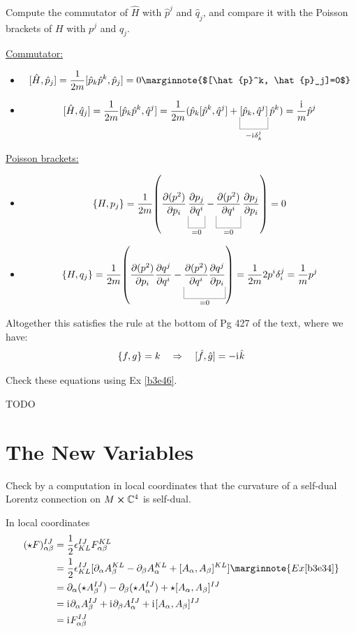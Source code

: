 \documentclass[10pt]{article}
\begin{document}
\begin{example}
	Compute the commutator of $\hat H$ with $\hat{p}^j$ and $\hat{q}_j$, and compare it with the Poisson brackets of $H$ with $p^j$ and $q_j$.
\end{example}
\sol \underline{Commutator:}
\begin{itemize}
	\item $$[\hat{H}, \hat{p}_j] = \frac{1}{2m}[\hat{p}_k\hat{p}^k, \hat{p}_j] = 0\marginnote{$[\hat{p}^k, \hat{p}_j]=0$}$$
	\item $$[\hat{H}, \hat{q}_j] = \frac{1}{2m}[\hat{p}_k\hat{p}^k, \hat{q}^j] = \frac{1}{2m}\p{\hat{p}_k[\hat{p}^k, \hat{q}^j] + \ub{[\hat{p}_k, \hat{q}^j]}{-
	\di\delta_k^j}\hat{p}^k} = \frac{\di}{m}\hat{p}^j$$
\end{itemize}
\underline{Poisson brackets:}
\begin{itemize}
	\item $$\br{H, p_j} = \frac{1}{2m}\p*{\pd{(p^2)}{p_i}\ub{\pd{p_j}{q^i}}{=0} - \ub{\pd{(p^2)}{q^i}}{=0}\pd{p_j}{p_i}} = 0$$
	\item $$\br{H, q_j} = \frac{1}{2m}\p*{\pd{(p^2)}{p_i}\pd{q^j}{q^i} - \ub{\pd{(p^2)}{q^i}\pd{q^j}{p_i}}{=0}} = \frac{1}{2m}2p^i\delta_i^j = \frac{1}{m}p^j$$
\end{itemize}
Altogether this satisfies the rule at the bottom of Pg 427 of the text, where we have:
$$
\lbrace f,g\rbrace = k\quad\Rightarrow\quad [\hat{f}, \hat{g}] = -\mathrm{i}\mkern1mu \hat{k}
$$


\begin{example}\label{b3e49}
	Check these equations using Ex \ref{b3e46}.
\end{example}
\sol TODO








\newpage
\section{The New Variables}\label{b3c5}







\begin{example}
	Check by a computation in local coordinates that the curvature of a self-dual Lorentz connection on $M\cross \mathbb{C}^4$ is self-dual.
\end{example}
\sol In local coordinates
$$
\begin{aligned}
	(\star F)_{\alpha\beta}^{IJ} &= \frac12 \epsilon_{KL}^{IJ} F_{\alpha\beta}^{KL}\\
	&= \frac12 \epsilon_{KL}^{IJ} [\partial_\alpha A_\beta^{KL} - \partial_\beta A_\alpha^{KL} + [A_\alpha, A_\beta]^{KL}]\marginnote{Ex \ref{b3e34}}\\
	&= \partial_\alpha(\star A_\beta^{IJ}) - \partial_\beta(\star A_\alpha^{IJ}) + \star[A_\alpha, A_\beta]^{IJ}\\
	&= \di\partial_\alpha A_\beta^{IJ} + \di\partial_\beta A_\alpha^{IJ} + \di[A_\alpha, A_\beta]^{IJ}\\
	&= \di F_{\alpha\beta}^{IJ}
\end{aligned}
$$
\end{document}
